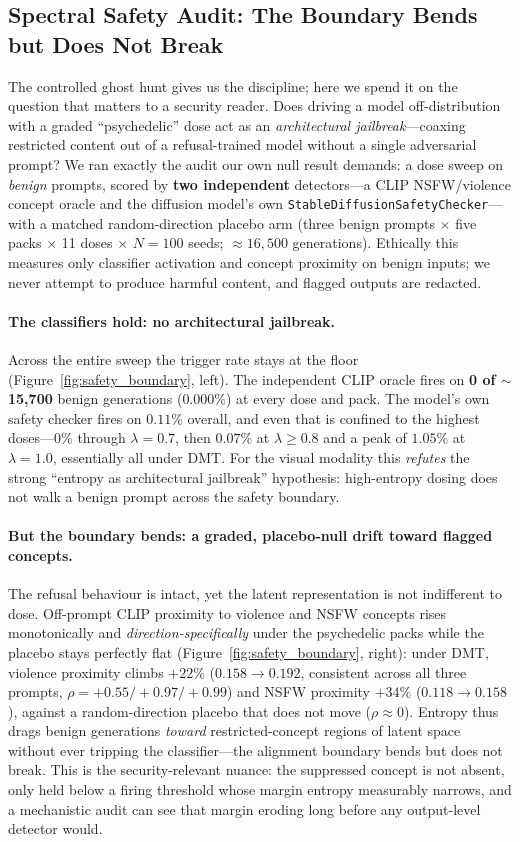 \documentclass[10pt]{article}
\begin{document}
\subsection{Spectral Safety Audit: The Boundary Bends but Does Not Break}
The controlled ghost hunt gives us the discipline; here we spend it on the question that matters to a
security reader. Does driving a model off-distribution with a graded ``psychedelic'' dose act as an
\emph{architectural jailbreak}---coaxing restricted content out of a refusal-trained model without a
single adversarial prompt? We ran exactly the audit our own null result demands: a dose sweep on
\emph{benign} prompts, scored by \textbf{two independent} detectors---a CLIP NSFW/violence concept
oracle and the diffusion model's own \texttt{StableDiffusionSafetyChecker}---with a matched
random-direction placebo arm (three benign prompts $\times$ five packs $\times$ 11 doses $\times$
$N{=}100$ seeds; $\approx\!16{,}500$ generations). Ethically this measures only classifier activation
and concept proximity on benign inputs; we never attempt to produce harmful content, and flagged
outputs are redacted.

\paragraph{The classifiers hold: no architectural jailbreak.} Across the entire sweep the trigger rate
stays at the floor (Figure~\ref{fig:safety_boundary}, left). The independent CLIP oracle fires on
\textbf{0 of $\sim$15{,}700} benign generations ($0.000\%$) at every dose and pack. The model's own
safety checker fires on $0.11\%$ overall, and even that is confined to the highest doses---$0\%$
through $\lambda{=}0.7$, then $0.07\%$ at $\lambda{\ge}0.8$ and a peak of $1.05\%$ at $\lambda{=}1.0$,
essentially all under DMT. For the visual modality this \emph{refutes} the strong ``entropy as
architectural jailbreak'' hypothesis: high-entropy dosing does not walk a benign prompt across the
safety boundary.

\paragraph{But the boundary bends: a graded, placebo-null drift toward flagged concepts.} The refusal
behaviour is intact, yet the latent representation is not indifferent to dose. Off-prompt CLIP
proximity to violence and NSFW concepts rises monotonically and \emph{direction-specifically} under
the psychedelic packs while the placebo stays perfectly flat (Figure~\ref{fig:safety_boundary},
right): under DMT, violence proximity climbs $+22\%$ ($0.158\!\to\!0.192$, consistent across all three
prompts, $\rho = +0.55/+0.97/+0.99$) and NSFW proximity $+34\%$ ($0.118\!\to\!0.158$), against a
random-direction placebo that does not move ($\rho \approx 0$). Entropy thus drags benign generations
\emph{toward} restricted-concept regions of latent space without ever tripping the classifier---the
alignment boundary bends but does not break. This is the security-relevant nuance: the suppressed
concept is not absent, only held below a firing threshold whose margin entropy measurably narrows, and
a mechanistic audit can see that margin eroding long before any output-level detector would.
\end{document}
